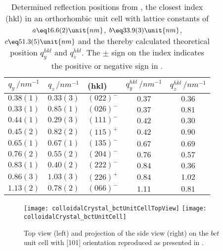 \documentclass[\main/dresen_thesis.tex]{subfiles}
\begin{document}
  \begin{table}[!htbp]
    \centering
    \caption{\label{tab:colloidalCrystals:gisaxs:reflections}Determined reflection positions from , the closest index (hkl) in an orthorhombic unit cell with lattice constants of $a \eq 16.6(2) \unit{nm}$, $b \eq 33.9(3) \unit{nm}$, $c \eq 51.3(5) \unit{nm}$ and the thereby calculated theoretical position $q^{hkl}_y$ and $q^{hkl}_z$. The $\pm$ sign on the index indicates the positive or negative sign in .}
    \begin{tabular}{ c | c | l | c | c}
      $q_y\,/ \unit{nm^{-1}}$ & $q_z\, / \unit{nm^{-1}}$ & (hkl) & $q^{hkl}_y\,/ \unit{nm^{-1}}$ & $q^{hkl}_z\,/ \unit{nm^{-1}}$\\
      \hline
      $0.38(1)$ & $0.33(3)$ & $(022)^{-}$ & $0.37$ & $0.36$\\
      $0.33(1)$ & $0.85(1)$ & $(026)^{-}$ & $0.37$ & $0.81$\\
      $0.44(1)$ & $0.29(3)$ & $(111)^{-}$ & $0.42$ & $0.30$\\
      $0.45(2)$ & $0.82(2)$ & $(115)^{+}$ & $0.42$ & $0.90$\\
      $0.65(1)$ & $0.67(1)$ & $(135)^{-}$ & $0.67$ & $0.69$\\
      $0.76(2)$ & $0.55(2)$ & $(204)^{-}$ & $0.76$ & $0.57$\\
      $0.83(1)$ & $0.40(2)$ & $(222)^{-}$ & $0.84$ & $0.36$\\
      $0.86(3)$ & $1.03(3)$ & $(226)^{+}$ & $0.84$ & $1.02$\\
      $1.13(2)$ & $0.78(2)$ & $(066)^{-}$ & $1.11$ & $0.81$\\
      \hline
    \end{tabular}
  \end{table}

  \begin{figure}[tb]
    \centering
    \texttt{[image: colloidalCrystal\_bctUnitCellTopView]}
    \texttt{[image: colloidalCrystal\_bctUnitCell]}
    \caption{\label{fig:colloidalCrystals:layers:gisaxsBCTUCDepiction}Top view (left) and projection of the side view (right) on the $bct$ unit cell with [101] orientation reproduced as presented in \cite{Wetterskog_2016_Tunin}.}
  \end{figure}
\end{document}
